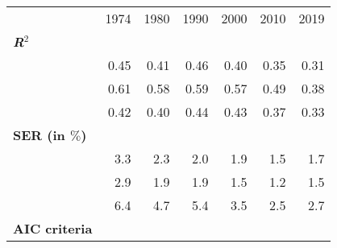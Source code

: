 \begin{tabular}{lllllll}
\cline{1-7}
\multicolumn{1}{c}{} &
  \multicolumn{1}{|r}{1974} &
  \multicolumn{1}{r}{1980} &
  \multicolumn{1}{r}{1990} &
  \multicolumn{1}{r}{2000} &
  \multicolumn{1}{r}{2010} &
  \multicolumn{1}{r}{2019} \\
\cline{1-7}
\multicolumn{1}{l}{\textbf{\textit{R}$^2$}} &
  \multicolumn{1}{|r}{} &
  \multicolumn{1}{r}{} &
  \multicolumn{1}{r}{} &
  \multicolumn{1}{r}{} &
  \multicolumn{1}{r}{} &
  \multicolumn{1}{r}{} \\
\multicolumn{1}{l}{\hspace{1em}{Model (A)}} &
  \multicolumn{1}{|r}{0.45} &
  \multicolumn{1}{r}{0.41} &
  \multicolumn{1}{r}{0.46} &
  \multicolumn{1}{r}{0.40} &
  \multicolumn{1}{r}{0.35} &
  \multicolumn{1}{r}{0.31} \\
\multicolumn{1}{l}{\hspace{1em}{Model (B)}} &
  \multicolumn{1}{|r}{0.61} &
  \multicolumn{1}{r}{0.58} &
  \multicolumn{1}{r}{0.59} &
  \multicolumn{1}{r}{0.57} &
  \multicolumn{1}{r}{0.49} &
  \multicolumn{1}{r}{0.38} \\
\multicolumn{1}{l}{\hspace{1em}{Model (C)}} &
  \multicolumn{1}{|r}{0.42} &
  \multicolumn{1}{r}{0.40} &
  \multicolumn{1}{r}{0.44} &
  \multicolumn{1}{r}{0.43} &
  \multicolumn{1}{r}{0.37} &
  \multicolumn{1}{r}{0.33} \\
\multicolumn{1}{l}{\textbf{SER (in $\%$)}} &
  \multicolumn{1}{|r}{} &
  \multicolumn{1}{r}{} &
  \multicolumn{1}{r}{} &
  \multicolumn{1}{r}{} &
  \multicolumn{1}{r}{} &
  \multicolumn{1}{r}{} \\
\multicolumn{1}{l}{\hspace{1em}{Model (A)}} &
  \multicolumn{1}{|r}{3.3} &
  \multicolumn{1}{r}{2.3} &
  \multicolumn{1}{r}{2.0} &
  \multicolumn{1}{r}{1.9} &
  \multicolumn{1}{r}{1.5} &
  \multicolumn{1}{r}{1.7} \\
\multicolumn{1}{l}{\hspace{1em}{Model (B)}} &
  \multicolumn{1}{|r}{2.9} &
  \multicolumn{1}{r}{1.9} &
  \multicolumn{1}{r}{1.9} &
  \multicolumn{1}{r}{1.5} &
  \multicolumn{1}{r}{1.2} &
  \multicolumn{1}{r}{1.5} \\
\multicolumn{1}{l}{\hspace{1em}{Model (C)}} &
  \multicolumn{1}{|r}{6.4} &
  \multicolumn{1}{r}{4.7} &
  \multicolumn{1}{r}{5.4} &
  \multicolumn{1}{r}{3.5} &
  \multicolumn{1}{r}{2.5} &
  \multicolumn{1}{r}{2.7} \\
\multicolumn{1}{l}{\textbf{AIC criteria}} &

\end{tabular}
